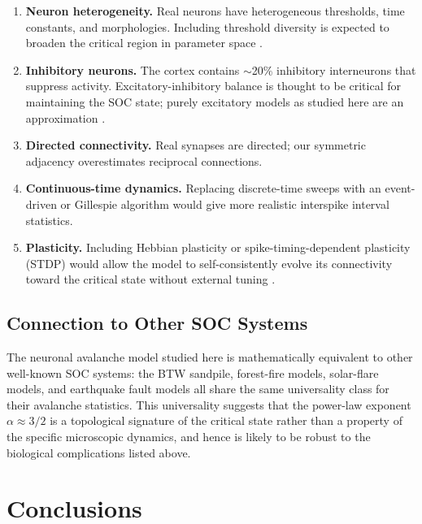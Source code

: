 \documentclass[12pt,a4paper]{article}
\begin{document}
\begin{enumerate}
  \item \textbf{Neuron heterogeneity.}  Real neurons have heterogeneous
        thresholds, time constants, and morphologies.  Including
        threshold diversity is expected to broaden the critical region
        in parameter space \cite{larremore2011}.

  \item \textbf{Inhibitory neurons.}  The cortex contains $\sim$20\%
        inhibitory interneurons that suppress activity.
        Excitatory-inhibitory balance is thought to be critical for
        maintaining the SOC state; purely excitatory models as studied
        here are an approximation \cite{poil2012}.

  \item \textbf{Directed connectivity.}  Real synapses are directed;
        our symmetric adjacency overestimates reciprocal connections.

  \item \textbf{Continuous-time dynamics.}  Replacing discrete-time
        sweeps with an event-driven or Gillespie algorithm would give
        more realistic interspike interval statistics.

  \item \textbf{Plasticity.}  Including Hebbian plasticity or
        spike-timing-dependent plasticity (STDP) would allow the model
        to self-consistently evolve its connectivity toward the critical
        state without external tuning \cite{bornholdt2000}.
\end{enumerate}

\subsection{Connection to Other SOC Systems}

The neuronal avalanche model studied here is mathematically equivalent
to other well-known SOC systems:  the BTW sandpile, forest-fire models,
solar-flare models, and earthquake fault models all share the same
universality class for their avalanche statistics.  This universality
suggests that the power-law exponent $\alpha \approx 3/2$ is a
topological signature of the critical state rather than a property of
the specific microscopic dynamics, and hence is likely to be robust
to the biological complications listed above.

\section{Conclusions}
\label{sec:conclusions}
\end{document}
